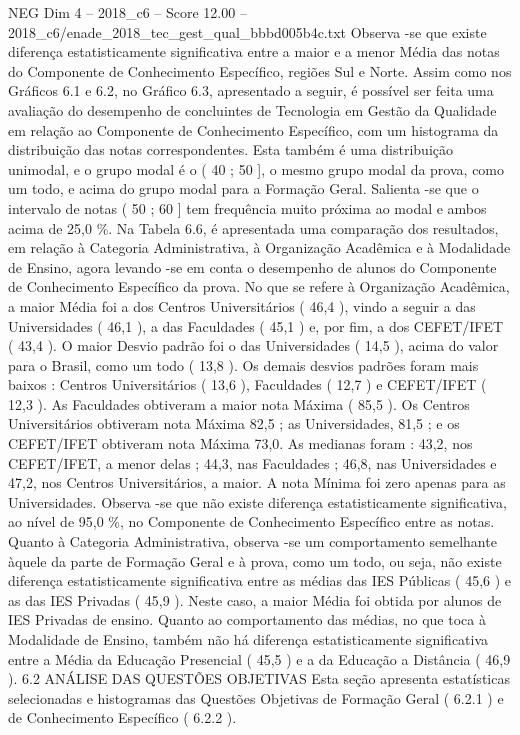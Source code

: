 \begin{textsample}{NEG Dim 4 – 2018\_c6 – Score 12.00 – 2018\_c6/enade\_2018\_tec\_gest\_qual\_bbbd005b4c.txt}
Observa -se que existe diferença estatisticamente significativa entre a maior e a menor Média das notas do Componente de Conhecimento Específico, regiões Sul e Norte.
Assim como nos Gráficos 6.1 e 6.2, no Gráfico 6.3, apresentado a seguir, é possível ser feita uma avaliação do desempenho de concluintes de Tecnologia em Gestão da Qualidade em relação ao Componente de Conhecimento Específico, com um histograma da distribuição das notas correspondentes.
Esta também é uma distribuição unimodal, e o grupo modal é o ( 40 ; 50 ], o mesmo grupo modal da prova, como um todo, e acima do grupo modal para a Formação Geral.
Salienta -se que o intervalo de notas ( 50 ; 60 ] tem frequência muito próxima ao modal e ambos acima de 25,0 \%.
Na Tabela 6.6, é apresentada uma comparação dos resultados, em relação à Categoria Administrativa, à Organização Acadêmica e à Modalidade de Ensino, agora levando -se em conta o desempenho de alunos do Componente de Conhecimento Específico da prova.
No que se refere à Organização Acadêmica, a maior Média foi a dos Centros Universitários ( 46,4 ), vindo a seguir a das Universidades ( 46,1 ), a das Faculdades ( 45,1 ) e, por fim, a dos CEFET/IFET ( 43,4 ).
O maior Desvio padrão foi o das Universidades ( 14,5 ), acima do valor para o Brasil, como um todo ( 13,8 ).
Os demais desvios padrões foram mais baixos : Centros Universitários ( 13,6 ), Faculdades ( 12,7 ) e CEFET/IFET ( 12,3 ).
As Faculdades obtiveram a maior nota Máxima ( 85,5 ).
Os Centros Universitários obtiveram nota Máxima 82,5 ; as Universidades, 81,5 ; e os CEFET/IFET obtiveram nota Máxima 73,0.
As medianas foram : 43,2, nos CEFET/IFET, a menor delas ; 44,3, nas Faculdades ; 46,8, nas Universidades e 47,2, nos Centros Universitários, a maior.
A nota Mínima foi zero apenas para as Universidades.
Observa -se que não existe diferença estatisticamente significativa, ao nível de 95,0 \%, no Componente de Conhecimento Específico entre as notas.
Quanto à Categoria Administrativa, observa -se um comportamento semelhante àquele da parte de Formação Geral e à prova, como um todo, ou seja, não existe diferença estatisticamente significativa entre as médias das IES Públicas ( 45,6 ) e as das IES Privadas ( 45,9 ).
Neste caso, a maior Média foi obtida por alunos de IES Privadas de ensino.
Quanto ao comportamento das médias, no que toca à Modalidade de Ensino, também não há diferença estatisticamente significativa entre a Média da Educação Presencial ( 45,5 ) e a da Educação a Distância ( 46,9 ). 6.2 ANÁLISE DAS QUESTÕES OBJETIVAS Esta seção apresenta estatísticas selecionadas e histogramas das Questões Objetivas de Formação Geral ( 6.2.1 ) e de Conhecimento Específico ( 6.2.2 ).

\end{textsample}

